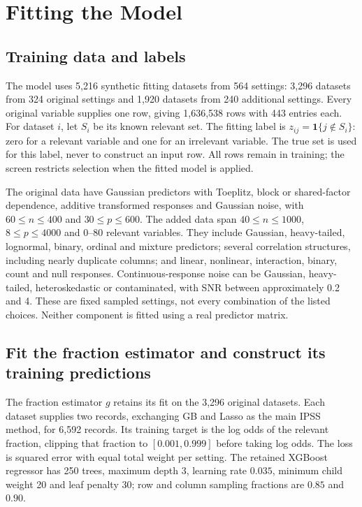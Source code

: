 \documentclass[10pt,letterpaper]{article}
\newcommand{\ind}{\mathbf{1}}
\begin{document}
\section{Fitting the Model}\label{sec:training}
\subsection{Training data and labels}
The model uses 5,216 synthetic fitting datasets from 564 settings: 3,296
datasets from 324 original settings and 1,920 datasets from 240 additional
settings. Every original variable supplies one row, giving 1,636,538 rows
with 443 entries each. For dataset $i$, let $S_i$ be its known relevant set.
The fitting label is $z_{ij}=\ind\{j\notin S_i\}$: zero for a relevant
variable and one for an irrelevant variable. The true set is used for
this label, never to construct an input row. All rows remain in training;
the screen restricts selection when the fitted model is applied.

The original data have Gaussian predictors with Toeplitz, block or
shared-factor dependence, additive transformed responses and Gaussian
noise, with $60\le n\le400$ and $30\le p\le600$.
The added data span $40\le n\le1000$, $8\le p\le4000$ and 0--80
relevant variables. They include Gaussian, heavy-tailed, lognormal,
binary, ordinal and mixture predictors; several correlation structures,
including nearly duplicate columns; and linear, nonlinear, interaction,
binary, count and null responses. Continuous-response noise can be
Gaussian, heavy-tailed, heteroskedastic or contaminated, with SNR between
approximately 0.2 and 4. These are fixed sampled settings, not every
combination of the listed choices. Neither component is fitted using a
real predictor matrix.

\subsection{Fit the fraction estimator and construct its training predictions}
The fraction estimator $g$ retains its fit on the 3,296 original datasets.
Each dataset supplies two records, exchanging GB and Lasso as the main
IPSS method, for 6,592 records. Its training target is the log odds of
the relevant fraction, clipping that fraction to $[0.001,0.999]$ before
taking log odds. The loss is squared error with equal total weight per
setting. The retained XGBoost regressor has 250 trees, maximum depth 3,
learning rate $0.035$, minimum child weight 20 and leaf penalty 30;
row and column sampling fractions are $0.85$ and $0.90$.
\end{document}
